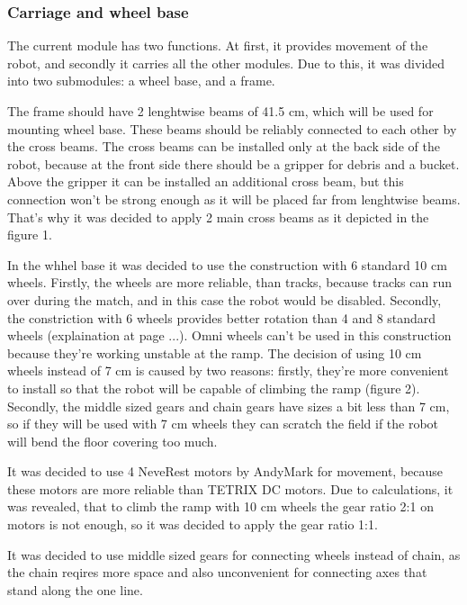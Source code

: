 \subsubsection{Carriage and wheel base}
  
  \begin{enumerate*}
    \item The current module has two functions. At first, it provides movement of the robot, and secondly it carries all the other modules. Due to this, it was divided into two submodules: a wheel base, and a frame.
    
    The frame should have 2 lenghtwise beams of 41.5 cm, which will be used for mounting wheel base. These beams should be reliably connected to each other by the cross beams. The cross beams can be installed only at the back side of the robot, because at the front side there should be a gripper for debris and a bucket. Above the gripper it can be installed an additional cross beam, but this connection won't be strong enough as it will be placed far from lenghtwise beams. That's why it was decided to apply 2 main cross beams as it depicted in the figure 1. 
    
    In the whhel base it was decided to use the construction with 6 standard 10 cm wheels. Firstly, the wheels are more reliable, than tracks, because tracks can run over during the match, and in this case the robot would be disabled. Secondly, the constriction with 6 wheels provides better rotation than 4 and 8 standard wheels (explaination at page ...). Omni wheels can't be used in this construction because they're working unstable at the ramp. 
    The decision of using 10 cm wheels instead of 7 cm is caused by two reasons: firstly, they're more convenient to install so that the robot will be capable of climbing the ramp (figure 2). Secondly, the middle sized gears and chain gears have sizes a bit less than 7 cm, so if they will be used with 7 cm wheels they can scratch the field if the robot will bend the floor covering too much.
    
    It was decided to use 4 NeveRest motors by AndyMark for movement, because these motors are more reliable than TETRIX DC motors. Due to calculations, it was revealed, that to climb the ramp with 10 cm wheels the gear ratio 2:1 on motors is not enough, so it was decided to apply the gear ratio 1:1.
    
    It was decided to use middle sized gears for connecting wheels instead of chain, as the chain reqires more space and also unconvenient for connecting axes that stand along the one line.
    

\end{enumerate*}
